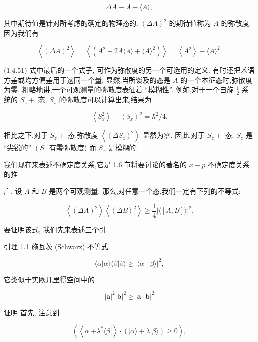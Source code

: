 \documentclass[lang=cn,newtx,10pt,scheme=chinese,thmcnt=section]{elegantbook}
\begin{document}
$$
{\Delta A} \equiv A - \langle A\rangle , \tag{1. 4.50}
$$

其中期待值是针对所考虑的确定的物理态的. ${\left( \Delta A\right) }^{2}$ 的期待值称为 $A$ 的弥散度. 因为我们有

$$
\left\langle {\left( \Delta A\right) }^{2}\right\rangle = \left\langle \left( {{A}^{2} - {2A}\langle A\rangle +\langle A{\rangle }^{2}}\right) \right\rangle = \left\langle {A}^{2}\right\rangle - \langle A{\rangle }^{2}. \tag{1. 4.51}
$$

(1.4.51) 式中最后的一个式子, 可作为弥散度的另一个可选用的定义. 有时还把术语方差或均方偏差用于这同一个量. 显然,当所谈及的态是 $A$ 的一个本征态时,弥散度为零. 粗略地讲,一个可观测量的弥散度表征着 “模糊性”. 例如,对于一个自旋 $\frac{1}{2}$ 系统的 ${S}_{z} +$ 态, ${S}_{x}$ 的弥散度可以计算出来,结果为

$$
\left\langle {S}_{x}^{2}\right\rangle - {\left\langle {S}_{x}\right\rangle }^{2} = {\hbar }^{2}/4. \tag{1. 4.52}
$$

相比之下,对于 ${S}_{z} +$ 态,弥散度 $\left\langle {\left( \Delta {S}_{z}\right) }^{2}\right\rangle$ 显然为零. 因此,对于 ${S}_{z} +$ 态, ${S}_{z}$ 是 “尖锐的” $\left( {S}_{z}\right.$ 有零弥散度) 而 ${S}_{x}$ 是模糊的.

我们现在来表述不确定度关系,它是 1.6 节将要讨论的著名的 $x - p$ 不确定度关系的推

广. 设 $A$ 和 $B$ 是两个可观测量. 那么,对任意一个态,我们一定有下列的不等式:

$$
\left\langle {\left( \Delta A\right) }^{2}\right\rangle \left\langle {\left( \Delta B\right) }^{2}\right\rangle \geq \frac{1}{4}{\left| \langle \left\lbrack A, B\right\rbrack \rangle \right| }^{2}. \tag{1. 4.53}
$$

要证明该式, 我们先来表述三个引.

引理 1.1 施瓦茨 (Schwarz) 不等式

$$
\langle \alpha \left| {\alpha \rangle \langle \beta }\right| \beta \rangle \geq {\left| \langle \alpha \mid \beta \rangle \right| }^{2}, \tag{1. 4.54}
$$

它类似于实欧几里得空间中的

$$
{\left| \mathbf{a}\right| }^{2}{\left| \mathbf{b}\right| }^{2} \geq {\left| \mathbf{a} \cdot \mathbf{b}\right| }^{2} \tag{1. 4.55}
$$

证明 首先, 注意到

$$
\left( {\left\langle {\alpha \left| {+{\lambda }^{ * }\langle \beta }\right| }\right\rangle \cdot \left( {\left| {\alpha \rangle + \lambda }\right| \beta \rangle }\right) \geq 0}\right) , \tag{1. 4.56}
$$
\end{document}
